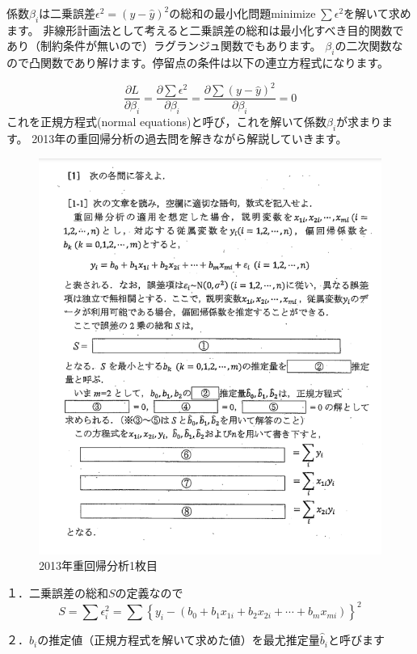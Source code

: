 \documentclass{jsarticle}
\begin{document}
係数$\beta_i$は二乗誤差$\epsilon^2=(y-\hat{y})^2$の総和の最小化問題$\text{minimize}\;\sum \epsilon^2$を解いて求めます。
非線形計画法として考えると二乗誤差の総和は最小化すべき目的関数であり（制約条件が無いので）ラグランジュ関数でもあります。
$\beta_i$の二次関数なので凸関数であり解けます。停留点の条件は以下の連立方程式になります。

$$\frac{\partial L}{\partial \beta_i}=\frac{\partial  \sum \epsilon^2}{\partial \beta_i}=\frac{\partial  \sum (y-\hat{y})^2}{\partial \beta_i}=0$$
これを正規方程式(normal equations)と呼び，これを解いて係数$\beta_i$が求まります。
2013年の重回帰分析の過去問を解きながら解説していきます。

\begin{figure}[htbp]
  \includegraphics[keepaspectratio, width=16cm]{figures/jyukaiki20131.png}
  \caption{2013年重回帰分析1枚目\label{jyukaiki20131}}
\end{figure}

\pagebreak

１．二乗誤差の総和$S$の定義なので
$$S=\sum \epsilon_i^2=\sum \left\{y_i-(b_0+b_1 x_{1i}+b_2 x_{2i}+\cdots+b_m x_{mi})\right\}^2$$

２．$b_i$の推定値（正規方程式を解いて求めた値）を最尤推定量$\hat{b}_i$と呼びます
\end{document}
